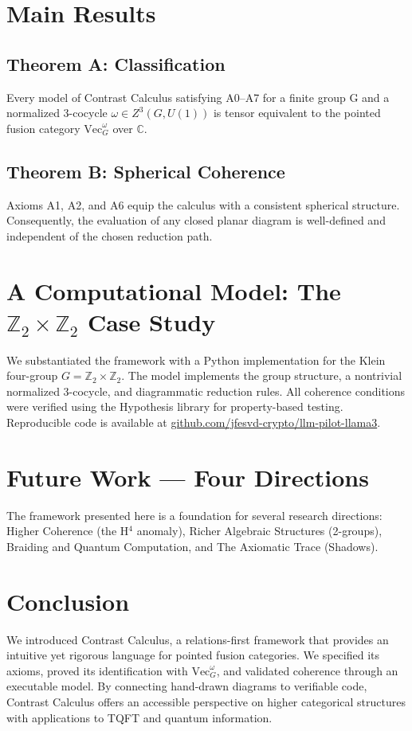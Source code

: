 \documentclass[11pt]{article}
\theoremstyle{definition}
\theoremstyle{remark}
\newcommand{\C}{\mathbb{C}}
\begin{document}
\section{Main Results}
\subsection{Theorem A: Classification}
Every model of Contrast Calculus satisfying A0–A7 for a finite group G and a normalized 3-cocycle $\omega \in Z^3(G, U(1))$ is tensor equivalent to the pointed fusion category $\mathrm{Vec}_G^\omega$ over $\C$.

\subsection{Theorem B: Spherical Coherence}
Axioms A1, A2, and A6 equip the calculus with a consistent spherical structure. Consequently, the evaluation of any closed planar diagram is well-defined and independent of the chosen reduction path.

\section{A Computational Model: The $\mathbb{Z}_2 \times \mathbb{Z}_2$ Case Study}
We substantiated the framework with a Python implementation for the Klein four-group $G=\mathbb{Z}_2 \times \mathbb{Z}_2$. The model implements the group structure, a nontrivial normalized 3-cocycle, and diagrammatic reduction rules. All coherence conditions were verified using the Hypothesis library for property-based testing. Reproducible code is available at \href{https://github.com/jfesvd-crypto/llm-pilot-llama3}{github.com/jfesvd-crypto/llm-pilot-llama3}.

\section{Future Work — Four Directions}
The framework presented here is a foundation for several research directions: Higher Coherence (the H$^4$ anomaly), Richer Algebraic Structures (2-groups), Braiding and Quantum Computation, and The Axiomatic Trace (Shadows).

\section{Conclusion}
We introduced Contrast Calculus, a relations-first framework that provides an intuitive yet rigorous language for pointed fusion categories. We specified its axioms, proved its identification with $\mathrm{Vec}_G^\omega$, and validated coherence through an executable model. By connecting hand-drawn diagrams to verifiable code, Contrast Calculus offers an accessible perspective on higher categorical structures with applications to TQFT and quantum information.



\end{document}
